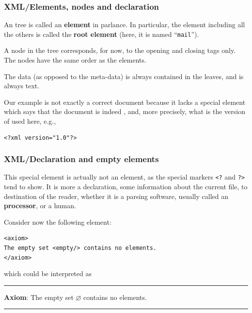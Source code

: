 %
\begin{frame}[containsverbatim]
\frametitle{XML/Elements, nodes and declaration}

An \XML tree is called an \textbf{element} in \XML parlance. In
particular, the element including all the others is called the
\textbf{root element} (here, it is named ``\texttt{mail}'').

\bigskip

A node in the \XML tree corresponds, for now, to the opening and
closing tags only. The nodes have the same order as the elements.

\bigskip

The data (as opposed to the meta-data) is always contained in the
leaves, and is always text.

\bigskip

Our example is not exactly a correct \XML document because it lacks a
special element which says that the document is indeed \XML, and, more
precisely, what is the version of \XML used here, e.g.,
\begin{verbatim}
<?xml version="1.0"?>
\end{verbatim}

\end{frame}

%
\begin{frame}[containsverbatim]
\frametitle{XML/Declaration and empty elements}

This special element is actually not an element, as the special
markers \texttt{<?} and \texttt{?>} tend to show. It is more a
declaration, some information about the current file, to destination
of the reader, whether it is a parsing software, usually called an
\textbf{\XML processor}, or a human.

\bigskip

Consider now the following element:
\begin{verbatim}
<axiom>
The empty set <empty/> contains no elements.
</axiom>
\end{verbatim}
which could be interpreted as\\

\noindent\rule{\linewidth}{0.5pt}
\textsf{
\textbf{Axiom}: The empty set \(\varnothing\) contains no elements.
}\\

\noindent\rule{\linewidth}{0.5pt}

\end{frame}

